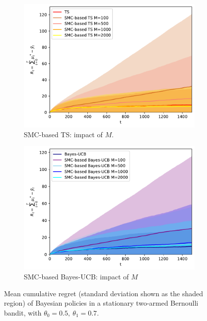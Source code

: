\begin{figure}[!h]
	\begin{subfigure}[b]{0.46\textwidth}
		\centering
		\includegraphics[width=\textwidth]{./fods_figs/static/bernoulli/A2/theta0.5_0.7_allM_cumulative_regret_ts}
		\caption{SMC-based TS: impact of $M$.}
	\end{subfigure}
	\begin{subfigure}[b]{0.46\textwidth}
		\centering
		\includegraphics[width=\textwidth]{./fods_figs/static/bernoulli/A2/theta0.5_0.7_allM_cumulative_regret_bucb}
		\caption{SMC-based Bayes-UCB: impact of $M$}
	\end{subfigure}
	
	\caption{Mean cumulative regret (standard deviation shown as the shaded region) of Bayesian policies in a stationary two-armed Bernoulli bandit, with $\theta_0=0.5, \ \theta_1=0.7$.}
\end{figure}

